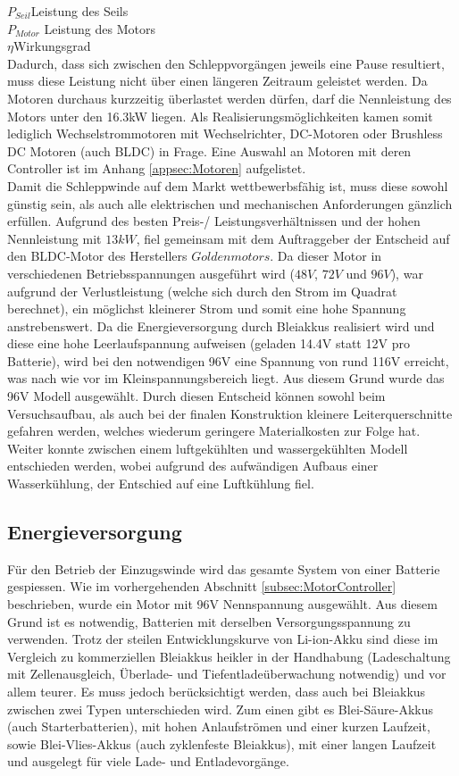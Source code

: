 $ P_{Seil} $\quad 	Leistung des Seils     \\
$ P_{Motor} $  Leistung des Motors    \\
$ \eta $\qquad  Wirkungsgrad     \\

Dadurch, dass sich zwischen den Schleppvorgängen jeweils eine Pause resultiert, muss diese Leistung nicht über einen längeren Zeitraum geleistet werden. Da Motoren durchaus kurzzeitig überlastet werden dürfen, darf die Nennleistung des Motors unter den 16.3kW liegen. Als Realisierungsmöglichkeiten kamen somit lediglich Wechselstrommotoren mit Wechselrichter, DC-Motoren oder Brushless DC Motoren (auch BLDC) in Frage. Eine Auswahl an Motoren mit deren Controller ist im Anhang \ref{appsec:Motoren} aufgelistet.\\
Damit die Schleppwinde auf dem Markt wettbewerbsfähig ist, muss diese sowohl günstig sein, als auch alle elektrischen und mechanischen Anforderungen gänzlich erfüllen. Aufgrund des besten Preis-/ Leistungsverhältnissen und der hohen Nennleistung mit $ 13kW $, fiel gemeinsam mit dem Auftraggeber der Entscheid auf den BLDC-Motor des Herstellers $ Goldenmotors $. Da dieser Motor in verschiedenen Betriebsspannungen ausgeführt wird ($ 48V $, $ 72V $ und $ 96V $), war aufgrund der Verlustleistung (welche sich durch den Strom im Quadrat berechnet), ein möglichst kleinerer Strom und somit eine hohe Spannung anstrebenswert. Da die Energieversorgung durch Bleiakkus realisiert wird und diese eine hohe Leerlaufspannung aufweisen (geladen 14.4V statt 12V pro Batterie), wird bei den notwendigen 96V eine Spannung von rund 116V erreicht, was nach wie vor im Kleinspannungsbereich liegt. Aus diesem Grund wurde das 96V Modell ausgewählt. Durch diesen Entscheid können sowohl beim Versuchsaufbau, als auch bei der finalen Konstruktion kleinere Leiterquerschnitte gefahren werden, welches wiederum geringere Materialkosten zur Folge hat. Weiter konnte zwischen einem luftgekühlten und wassergekühlten Modell entschieden werden, wobei aufgrund des aufwändigen Aufbaus einer Wasserkühlung, der Entschied auf eine Luftkühlung fiel.  


\subsection{Energieversorgung}\label{subsec:Energieversorgung}

Für den Betrieb der Einzugswinde wird das gesamte System von einer Batterie gespiessen. Wie im vorhergehenden Abschnitt \ref{subsec:MotorController} beschrieben, wurde ein Motor mit 96V Nennspannung ausgewählt. Aus diesem Grund ist es notwendig, Batterien mit derselben Versorgungsspannung zu verwenden. Trotz der steilen Entwicklungskurve von Li-ion-Akku sind diese im Vergleich zu kommerziellen Bleiakkus heikler in der Handhabung (Ladeschaltung mit Zellenausgleich, Überlade- und Tiefentladeüberwachung notwendig) und vor allem teurer. Es muss jedoch berücksichtigt werden, dass auch bei Bleiakkus zwischen zwei Typen unterschieden wird. Zum einen gibt es Blei-Säure-Akkus (auch Starterbatterien), mit hohen Anlaufströmen und einer kurzen Laufzeit, sowie Blei-Vlies-Akkus (auch zyklenfeste Bleiakkus), mit einer langen Laufzeit und ausgelegt für viele Lade- und Entladevorgänge.

